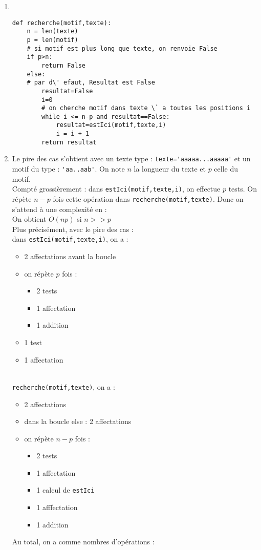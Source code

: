 \begin{solution}
\begin{enumerate}
\item ~\\
\vspace{-0.7cm}
\begin{verbatim}
def recherche(motif,texte):
    n = len(texte)
    p = len(motif)
    # si motif est plus long que texte, on renvoie False
    if p>n:
        return False
    else:
    # par d\' efaut, Resultat est False
        resultat=False
        i=0
        # on cherche motif dans texte \` a toutes les positions i 
        while i <= n-p and resultat==False:
            resultat=estIci(motif,texte,i)
            i = i + 1
        return resultat           
\end{verbatim}
\item Le pire des cas s'obtient avec un texte type : \verb?texte='aaaaa...aaaaa'? et un motif du type : \verb?'aa..aab'?. On note $n$ la longueur du texte et $p$ celle du motif.\\
Compt\' e grossi\` erement : dans \verb?estIci(motif,texte,i)?, on effectue $p$ tests. On r\' ep\` ete $n-p$ fois cette op\' eration dans \verb?recherche(motif,texte)?. Donc on s'attend \` a une complexit\' e en :  \\
On obtient $O(np)$ si $n>>p$\bigskip \\
Plus pr\' ecis\' ement, avec le pire des cas :\\
dans \verb?estIci(motif,texte,i)?, on a :
\begin{itemize}
\item 2 affectations avant la boucle
\item on r\' ep\` ete $p$ fois :
\begin{itemize}
\item 2 tests
\item 1 affectation
\item 1 addition
\end{itemize}
\item 1 test
\item 1 affectation
\end{itemize}
\\
 \verb?recherche(motif,texte)?, on a :
 \begin{itemize}
 \item 2 affectations
 \item dans la boucle else : 2 affectations
 \item on r\' ep\` ete $n-p$ fois :
 \begin{itemize}
 \item 2 tests
 \item 1 affectation
 \item 1 calcul de \verb?estIci?
 \item 1 afffectation
 \item 1 addition
 \end{itemize}
 \end{itemize}
Au total, on a comme nombres d'op\' erations : \\
\end{enumerate}
\end{solution}


